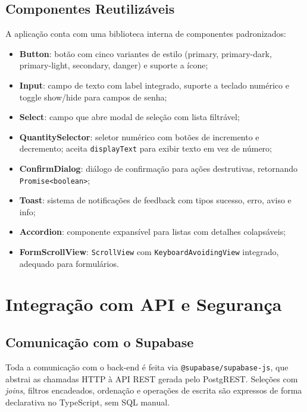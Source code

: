 \documentclass[
	12pt,				%
	oneside,			%
	a4paper,			%
	english,			%
	brazil				%
	]{abntex2}
\begin{document}
\section{Componentes Reutilizáveis}

A aplicação conta com uma biblioteca interna de componentes padronizados:

\begin{itemize}
  \item \textbf{Button}: botão com cinco variantes de estilo (primary, primary-dark, primary-light, secondary, danger) e suporte a ícone;
  \item \textbf{Input}: campo de texto com label integrado, suporte a teclado numérico e toggle show/hide para campos de senha;
  \item \textbf{Select}: campo que abre modal de seleção com lista filtrável;
  \item \textbf{QuantitySelector}: seletor numérico com botões de incremento e decremento; aceita \texttt{displayText} para exibir texto em vez de número;
  \item \textbf{ConfirmDialog}: diálogo de confirmação para ações destrutivas, retornando \texttt{Promise<boolean>};
  \item \textbf{Toast}: sistema de notificações de feedback com tipos sucesso, erro, aviso e info;
  \item \textbf{Accordion}: componente expansível para listas com detalhes colapsáveis;
  \item \textbf{FormScrollView}: \texttt{ScrollView} com \texttt{KeyboardAvoidingView} integrado, adequado para formulários.
\end{itemize}

\chapter{Integração com API e Segurança}

\section{Comunicação com o Supabase}

Toda a comunicação com o back-end é feita via \texttt{@supabase/supabase-js}, que abstrai as chamadas HTTP à API REST gerada pelo PostgREST. Seleções com \textit{joins}, filtros encadeados, ordenação e operações de escrita são expressos de forma declarativa no TypeScript, sem SQL manual.
\end{document}
